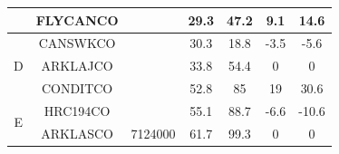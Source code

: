 \begin{linenumbers}
\begin{table}[htbp]
\begin{tabular}{ccccccc}
	                                                  &   FLYCANCO   &              & 29.3 &           47.2            & 9.1  &            14.6            \\ \midrule
	               \multirow{3}{*}{D}                 &   CANSWKCO   &              & 30.3 &           18.8            & -3.5 &            -5.6            \\
	                                                  &   ARKLAJCO   &              & 33.8 &           54.4            &  0   &             0              \\
	                                                  &   CONDITCO   &              & 52.8 &            85             &  19  &            30.6            \\ \midrule
	               \multirow{2}{*}{E}                 &   HRC194CO   &              & 55.1 &           88.7            & -6.6 &           -10.6            \\
	                                                  &   ARKLASCO   &   7124000    & 61.7 &           99.3            &  0   &             0              \\ \bottomrule
\end{tabular}
\end{table}


\end{linenumbers}

